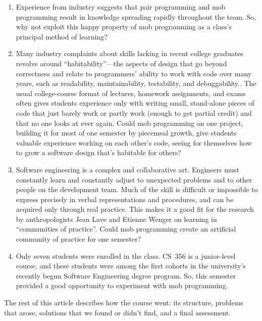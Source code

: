\documentclass{article}
\begin{document}
\begin{enumerate}
  \item Experience from industry suggests that pair programming and mob
  programming result in knowledge spreading rapidly throughout the team.
  So, why not exploit this happy property of mob programming as a class's
  principal method of learning?

  \item Many industry complaints about skills lacking in recent college
  graduates revolve around ``habitability''---the aspects of design that
  go beyond correctness and relate to programmers' ability to work with
  code over many years, such as readability, maintainability, testability,
  and debuggability.\cite{Gabriel1996}. The usual college-course format
  of lectures, homework assignments, and exams often gives students
  experience only with writing small, stand-alone pieces of code that just
  barely work or partly work (enough to get partial credit) and that no one
  looks at ever again. Could mob programming on one project, building it for
  most of one semester by piecemeal growth, give students valuable experience
  working on each other's code, seeing for themselves how to grow a 
  software design that's habitable for others?

  \item Software engineering is a complex and collaborative art.
  Engineers must constantly learn and constantly adjust to unexpected problems
  and to other people on the development team. Much of the skill is difficult
  or impossible to express precisely in verbal representations and procedures,
  and can be acquired only through real practice. This makes it a good fit for
  the research by anthropologists Jean Lave and Etienne Wenger on learning in
  ``communities of practice''.\cite{wenger2015introduction} Could mob
  programming create an artificial community of practice for one semester?

  \item Only seven students were enrolled in the class. CS~356 is a
  junior-level course, and these students were among the first cohorts in the
  university's recently begun Software Engineering degree program. So,
  this semester provided a good opportunity to experiment with mob
  programming.
\end{enumerate}

The rest of this article describes how the course went: its structure,
problems that arose, solutions that we found or didn't find, and a final
assessment.
\end{document}
